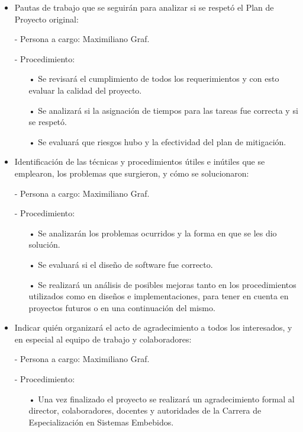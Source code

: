 \documentclass[11pt]{charter}
\begin{document}
\begin{itemize}
\item Pautas de trabajo que se seguirán para analizar si se respetó el Plan de Proyecto original:

 - Persona a cargo: Maximiliano Graf.
 
 - Procedimiento:
 \begin{itemize}
 \item[•] Se revisará el cumplimiento de todos los requerimientos y con esto evaluar la calidad del proyecto.
 \item[•] Se analizará si la asignación de tiempos para las tareas fue correcta y si se respetó.
 \item[•] Se evaluará que riesgos hubo y la efectividad del plan de mitigación.
 \end{itemize}

\item Identificación de las técnicas y procedimientos útiles e inútiles que se emplearon, los problemas que surgieron, y cómo se solucionaron:

 - Persona a cargo: Maximiliano Graf.
 
 - Procedimiento:
 \begin{itemize}
 \item[•] Se analizarán los problemas ocurridos y la forma en que se les dio solución.
 \item[•] Se evaluará si el diseño de software fue correcto.
 \item[•] Se realizará un análisis de posibles mejoras tanto en los procedimientos utilizados como en diseños e implementaciones, para tener en cuenta en proyectos futuros o en una continuación del mismo.
  
 \end{itemize}
 
 \item Indicar quién organizará el acto de agradecimiento a todos los interesados, y en especial al equipo de trabajo y colaboradores:
 
 - Persona a cargo: Maximiliano Graf.
 
 - Procedimiento:
 \begin{itemize}
 \item[•] Una vez finalizado el proyecto se realizará un agradecimiento formal al director, colaboradores, docentes
y autoridades de la Carrera de Especialización en Sistemas Embebidos.
 \end{itemize}
 
\end{itemize}
\end{document}

